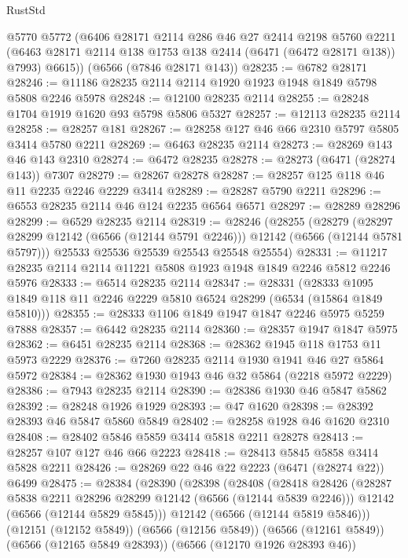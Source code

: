 \begin{lexlean}{RustStd}
\begin{coremodule}
      @5770
      @5772
      (@6406
        @28171
        @2114
        @286
        @46
        @27
        @2414
        @2198
        @5760
        @2211
        (@6463 @28171 @2114 @138 @1753 @138 @2414 (@6471 (@6472 @28171 @138)) @7993)
        @6615))
    (@6566 (@7846 @28171 @143))
@28235 := @6782 @28171
@28246 := @11186 @28235 @2114 @2114 @1920 @1923 @1948 @1849 @5798 @5808 @2246 @5978
@28248 := @12100 @28235 @2114
@28255 := @28248 @1704 @1919 @1620 @93 @5798 @5806 @5327
@28257 := @12113 @28235 @2114
@28258 := @28257 @181
@28267 := @28258 @127 @46 @66 @2310 @5797 @5805 @3414 @5780 @2211
@28269 := @6463 @28235 @2114
@28273 := @28269 @143 @46 @143 @2310
@28274 := @6472 @28235
@28278 := @28273 (@6471 (@28274 @143)) @7307
@28279 := @28267 @28278
@28287 := @28257 @125 @118 @46 @11 @2235 @2246 @2229 @3414
@28289 := @28287 @5790 @2211
@28296 := @6553 @28235 @2114 @46 @124 @2235 @6564 @6571
@28297 := @28289 @28296
@28299 := @6529 @28235 @2114
@28319 := @28246
    (@28255
      (@28279
        (@28297 @28299 @12142 (@6566 (@12144 @5791 @2246)))
        @12142
        (@6566 (@12144 @5781 @5797)))
      @25533
      @25536
      @25539
      @25543
      @25548
      @25554)
@28331 := @11217 @28235 @2114 @2114 @11221 @5808 @1923 @1948 @1849 @2246 @5812 @2246 @5976
@28333 := @6514 @28235 @2114
@28347 := @28331
    (@28333 @1095 @1849 @118 @11 @2246 @2229 @5810 @6524 @28299 (@6534 (@15864 @1849 @5810)))
@28355 := @28333 @1106 @1849 @1947 @1847 @2246 @5975 @5259 @7888
@28357 := @6442 @28235 @2114
@28360 := @28357 @1947 @1847 @5975
@28362 := @6451 @28235 @2114
@28368 := @28362 @1945 @118 @1753 @11 @5973 @2229
@28376 := @7260 @28235 @2114 @1930 @1941 @46 @27 @5864 @5972
@28384 := @28362 @1930 @1943 @46 @32 @5864 (@2218 @5972 @2229)
@28386 := @7943 @28235 @2114
@28390 := @28386 @1930 @46 @5847 @5862
@28392 := @28248 @1926 @1929
@28393 := @47 @1620
@28398 := @28392 @28393 @46 @5847 @5860 @5849
@28402 := @28258 @1928 @46 @1620 @2310
@28408 := @28402 @5846 @5859 @3414 @5818 @2211 @28278
@28413 := @28257 @107 @127 @46 @66 @2223
@28418 := @28413 @5845 @5858 @3414 @5828 @2211
@28426 := @28269 @22 @46 @22 @2223 (@6471 (@28274 @22)) @6499
@28475 := @28384
    (@28390
      (@28398
        (@28408
          (@28418
            @28426
            (@28287 @5838 @2211 @28296 @28299 @12142 (@6566 (@12144 @5839 @2246)))
            @12142
            (@6566 (@12144 @5829 @5845)))
          @12142
          (@6566 (@12144 @5819 @5846)))
        (@12151 (@12152 @5849))
        (@6566 (@12156 @5849))
        (@6566 (@12161 @5849))
        (@6566 (@12165 @5849 @28393))
        (@6566 (@12170 @1926 @28393 @46))

\end{coremodule}
\end{lexlean}
